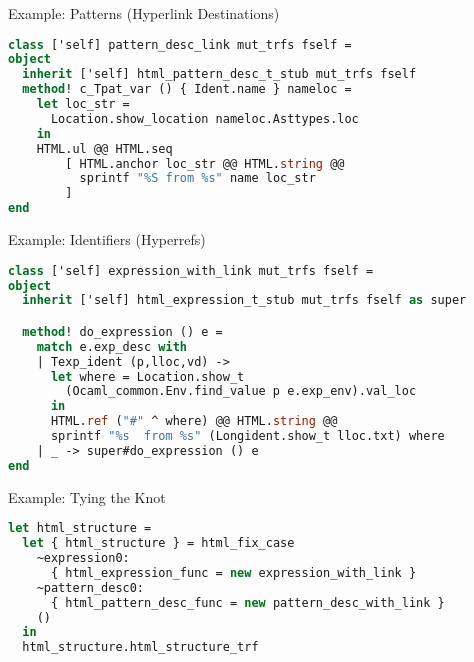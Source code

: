 \documentclass{beamer}
\theoremstyle{definition}
\theoremstyle{plain} %
\begin{document}
\begin{frame}[fragile]{Example: Patterns (Hyperlink Destinations)}
\begin{lstlisting}[language=ocaml] 
class ['self] pattern_desc_link mut_trfs fself = 
object
  inherit ['self] html_pattern_desc_t_stub mut_trfs fself
  method! c_Tpat_var () { Ident.name } nameloc =
    let loc_str = 
      Location.show_location nameloc.Asttypes.loc 
    in
    HTML.ul @@ HTML.seq
        [ HTML.anchor loc_str @@ HTML.string @@ 
          sprintf "%S from %s" name loc_str
        ]
end
\end{lstlisting}
\end{frame}


\begin{comment}
  Equally, here we see the redefinition for a referencing position (in expressions). An interesting part is that we do not
  see a method-per-constructor here; this is because the expression with its environment in a typed tree is represented by a structure, and
  when a type is a structure we generate a method called \lstinline|do_$\mbox{this type}$|. 
\end{comment}

\begin{frame}[fragile]{Example: Identifiers (Hyperrefs)}
\begin{lstlisting}[language=ocaml] 
class ['self] expression_with_link mut_trfs fself = 
object
  inherit ['self] html_expression_t_stub mut_trfs fself as super

  method! do_expression () e =
    match e.exp_desc with
    | Texp_ident (p,lloc,vd) ->
      let where = Location.show_t
        (Ocaml_common.Env.find_value p e.exp_env).val_loc 
      in
      HTML.ref ("#" ^ where) @@ HTML.string @@
      sprintf "%s  from %s" (Longident.show_t lloc.txt) where
    | _ -> super#do_expression () e
end
\end{lstlisting}
\end{frame}


\begin{comment}
  Finally, we have to create the desired transformation using two new classes we have just redefined and 58 old classes,
  generated by our framework. That what we do here. \lstinline|htm_fix_case| is a fixpoint combinator, specific for the given
  plugin (\lstinline|html|) and given mutually-recursive type declaration.
\end{comment}

\begin{frame}[fragile]{Example: Tying the Knot}
\begin{lstlisting}[language=ocaml] 
let html_structure =
  let { html_structure } = html_fix_case
    ~expression0:
      { html_expression_func = new expression_with_link }
    ~pattern_desc0:
      { html_pattern_desc_func = new pattern_desc_with_link }
    ()
  in
  html_structure.html_structure_trf
\end{lstlisting}
\end{frame}
\end{document}
